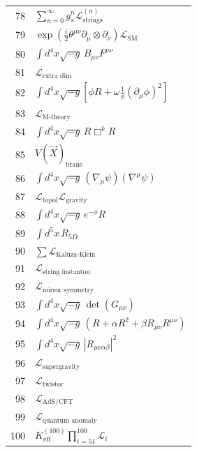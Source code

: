 \documentclass[11pt,a4paper]{article}
\begin{document}
\begin{longtable}{r p{}}
	78 & \(\displaystyle \sum_{n=0}^\infty g_s^n \mathcal{L}^{(n)}_{\text{strings}}\) \\
	79 & \(\displaystyle \exp\left(\frac{i}{2}\theta^{\mu\nu}\partial_\mu\otimes\partial_\nu\right)\mathcal{L}_{\text{SM}}\) \\
	80 & \(\displaystyle \int d^4x\sqrt{-g}\,B_{\mu\nu}F^{\mu\nu}\) \\
	81 & \(\displaystyle \mathcal{L}_{\text{extra dim}}\) \\
	82 & \(\displaystyle \int d^4x\sqrt{-g}\left[\phi R + \omega\frac{1}{\phi}(\partial_\mu\phi)^2\right]\) \\
	83 & \(\displaystyle \mathcal{L}_{\text{M-theory}}\) \\
	84 & \(\displaystyle \int d^4x\sqrt{-g}\,R\Box^k R\) \\
	85 & \(\displaystyle V(\vec{X})_{\text{brane}}\) \\
	86 & \(\displaystyle \int d^4x\sqrt{-g}\,(\nabla_\mu\psi)(\nabla^\mu\psi)\) \\
	87 & \(\displaystyle \mathcal{L}_{\text{topol}}\mathcal{L}_{\text{gravity}}\) \\
	88 & \(\displaystyle \int d^4x\sqrt{-g}\,e^{-\phi}R\) \\
	89 & \(\displaystyle \int d^5x\,R_{5D}\) \\
	90 & \(\displaystyle \sum\mathcal{L}_{\text{Kaluza-Klein}}\) \\
	91 & \(\displaystyle \mathcal{L}_{\text{string instanton}}\) \\
	92 & \(\displaystyle \mathcal{L}_{\text{mirror symmetry}}\) \\
	93 & \(\displaystyle \int d^4x\sqrt{-g}\,\det(G_{\mu\nu})\) \\
	94 & \(\displaystyle \int d^4x\sqrt{-g}\,\left(R + \alpha R^2 + \beta R_{\mu\nu}R^{\mu\nu}\right)\) \\
	95 & \(\displaystyle \int d^4x\sqrt{-g}\,|R_{\mu\nu\alpha\beta}|^2\) \\
	96 & \(\displaystyle \mathcal{L}_{\text{supergravity}}\) \\
	97 & \(\displaystyle \mathcal{L}_{\text{twistor}}\) \\
	98 & \(\displaystyle \mathcal{L}_{\text{AdS/CFT}}\) \\
	99 & \(\displaystyle \mathcal{L}_{\text{quantum anomaly}}\) \\
	100 & \(\displaystyle K^{(100)}_{\mathrm{eff}}\prod_{i=51}^{100}\mathcal{L}_i\) \\
	

\end{longtable}
\end{document}

